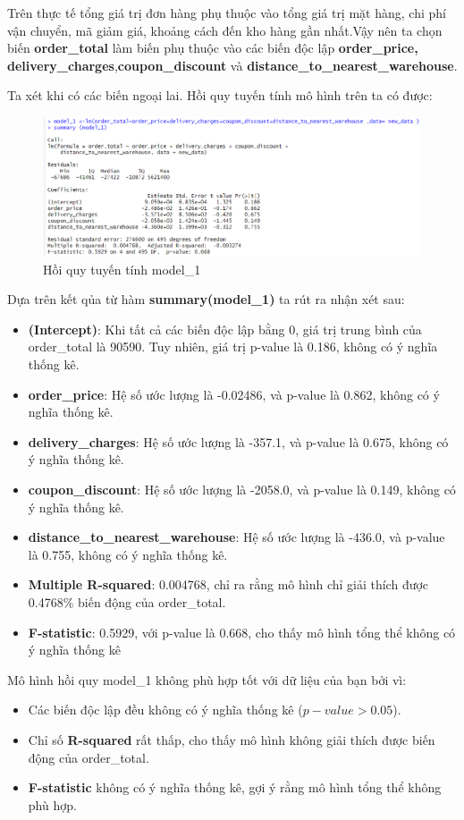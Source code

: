 Trên thực tế tổng giá trị đơn hàng phụ thuộc vào tổng giá trị mặt hàng, chi phí vận chuyển, mã giảm giá, khoảng cách đến kho hàng gần nhất.Vậy nên ta chọn biến \textbf{order\_total} làm biến phụ thuộc vào các biến độc lập \textbf{order\_price, delivery\_charges},\textbf{coupon\_discount} và \textbf{distance\_to\_nearest\_warehouse}.

Ta xét khi có các biến ngoại lai. Hồi quy tuyến tính mô hình trên ta có được:
\begin{figure}[ht]
  \centering
  \includegraphics[width=0.7\linewidth]{graphics/5.5.2.png}
  \caption{Hồi quy tuyến tính model\_1 }
\end{figure}
\newpage
Dựa trên kết qủa từ hàm \textbf{summary(model\_1)} ta rút ra nhận xét sau:
\begin{itemize}
\item \textbf{(Intercept)}: Khi tất cả các biến độc lập bằng 0, giá trị trung bình của order\_total là 90590. Tuy nhiên, giá trị p-value là 0.186, không có ý nghĩa thống kê.
\item \textbf{order\_price}: Hệ số ước lượng là -0.02486, và p-value là 0.862, không có ý nghĩa thống kê.
\item \textbf{delivery\_charges}: Hệ số ước lượng là -357.1, và p-value là 0.675, không có ý nghĩa thống kê.
\item \textbf{coupon\_discount}: Hệ số ước lượng là -2058.0, và p-value là 0.149, không có ý nghĩa thống kê.
\item \textbf{distance\_to\_nearest\_warehouse}: Hệ số ước lượng là -436.0, và p-value là 0.755, không có ý nghĩa thống kê.
\item\textbf{Multiple R-squared}: 0.004768, chỉ ra rằng mô hình chỉ giải thích được 0.4768\% biến động của order\_total.
\item\textbf{F-statistic}: 0.5929, với p-value là 0.668, cho thấy mô hình tổng thể không có ý nghĩa thống kê
\end{itemize}
Mô hình hồi quy model\_1 không phù hợp tốt với dữ liệu của bạn bởi vì:
\begin{itemize}
\item Các biến độc lập đều không có ý nghĩa thống kê ($p-value > 0.05$).
\item Chỉ số \textbf{R-squared} rất thấp, cho thấy mô hình không giải thích được biến động của order\_total.
\item\textbf{F-statistic} không có ý nghĩa thống kê, gợi ý rằng mô hình tổng thể không phù hợp.
\end{itemize}

